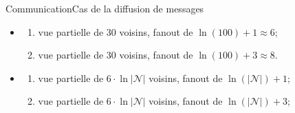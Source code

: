 \begin{frame}{Communication}{Cas de la diffusion de messages}

  \begin{center}
    
  \end{center}
  
  \begin{center}
      
  \end{center}

  \begin{itemize}
  \item \CYCLON 
    \begin{enumerate}
    \item vue partielle de 30 voisins, fanout de $\ln(100)+1\approx 6$;
    \item vue partielle de 30 voisins, fanout de  $\ln(100)+3 \approx 8$.
    \end{enumerate}
  \item \SPRAY
    \begin{enumerate}
    \item vue partielle de $6\cdot\ln|\mathcal{N}|$ voisins,
      fanout de $\ln(|\mathcal{N}|)+1$;
    \item vue partielle de $6\cdot\ln|\mathcal{N}|$ voisins,
      fanout de $\ln(|\mathcal{N}|)+3$;
    \end{enumerate}
  \end{itemize}


\end{frame}

